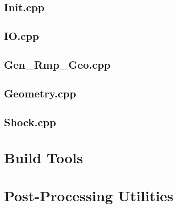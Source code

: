 \documentclass[a4paper, 12pt]{report}
\let\stdsection\section
\renewcommand\section{\newpage\stdsection}
\begin{document}
\begin{center}
\subsection{Init.cpp}
\begin{comment}
\end{comment}



\subsection{IO.cpp}
\begin{comment}
\end{comment}



\subsection{Gen\_Rmp\_Geo.cpp}
\begin{comment}
\end{comment}



\subsection{Geometry.cpp}
\begin{comment}
\end{comment}




\subsection{Shock.cpp}
\begin{comment}
\end{comment}




\section{Build Tools}
\begin{comment}
\end{comment}




\section{Post-Processing Utilities}
\begin{comment}
\end{comment}




\end{center}
\end{document}
